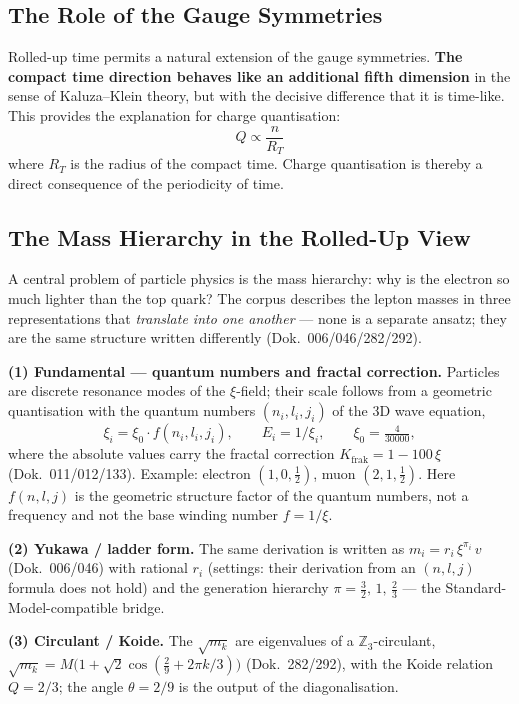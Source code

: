 \subsection{The Role of the Gauge Symmetries}

Rolled-up time permits a natural extension of the gauge symmetries. \textbf{The compact time direction behaves like an additional fifth dimension} in the sense of Kaluza--Klein theory, but with the decisive difference that it is time-like. This provides the explanation for charge quantisation:
\[
 Q \propto \frac{n}{R_T}
\]
where $R_T$ is the radius of the compact time. Charge quantisation is thereby a direct consequence of the periodicity of time.

\subsection{The Mass Hierarchy in the Rolled-Up View}

A central problem of particle physics is the mass hierarchy: why is the electron so much lighter than the top quark? The corpus describes the lepton masses in three representations that \emph{translate into one another} --- none is a separate ansatz; they are the same structure written differently (Dok.~006/046/282/292).

\textbf{(1) Fundamental --- quantum numbers and fractal correction.} Particles are discrete resonance modes of the $\xi$-field; their scale follows from a geometric quantisation with the quantum numbers $(n_i,l_i,j_i)$ of the 3D wave equation,
\[
  \xi_i = \xi_0\cdot f(n_i,l_i,j_i),\qquad E_i = 1/\xi_i,\qquad \xi_0=\tfrac{4}{30000},
\]
where the absolute values carry the fractal correction $K_{\text{frak}}=1-100\,\xi$ (Dok.~011/012/133). Example: electron $(1,0,\tfrac12)$, muon $(2,1,\tfrac12)$. Here $f(n,l,j)$ is the geometric structure factor of the quantum numbers, not a frequency and not the base winding number $f = 1/\xi$.

\textbf{(2) Yukawa / ladder form.} The same derivation is written as $m_i = r_i\,\xi^{\pi_i}\,v$ (Dok.~006/046) with rational $r_i$ (settings: their derivation from an $(n,l,j)$ formula does not hold) and the generation hierarchy $\pi=\tfrac32,\,1,\,\tfrac23$ --- the Standard-Model-compatible bridge.

\textbf{(3) Circulant / Koide.} The $\sqrt{m_k}$ are eigenvalues of a $\mathbb{Z}_3$-circulant, $\sqrt{m_k}=M\bigl(1+\sqrt2\cos(\tfrac29+2\pi k/3)\bigr)$ (Dok.~282/292), with the Koide relation $Q=2/3$; the angle $\theta=2/9$ is the output of the diagonalisation.

